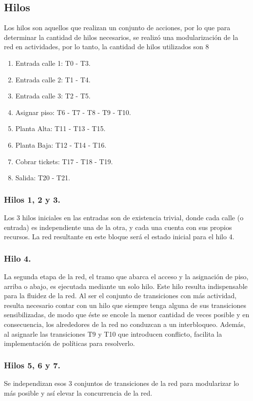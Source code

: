 \documentclass[12pt,a4paper]{article}
\begin{document}
\subsection{Hilos}
 Los hilos son aquellos que realizan un conjunto de acciones, por lo que para determinar la cantidad de hilos necesarios, se realizó una modularización de la red en actividades, por lo tanto, la cantidad de hilos utilizados son 8

\begin{enumerate}[leftmargin=1.5cm]
\item Entrada calle 1: T0 - T3.
\item Entrada calle 2: T1 - T4.
\item Entrada calle 3: T2 - T5.
\item Asignar piso: T6 - T7 - T8 - T9 - T10.
\item Planta Alta: T11 - T13 - T15.
\item Planta Baja: T12 - T14 - T16.
\item Cobrar tickets: T17 - T18 - T19.
\item Salida: T20 - T21.
\end{enumerate}
\subsubsection*{Hilos 1, 2 y 3.}
Los 3 hilos iniciales en las entradas son de existencia trivial, donde cada calle (o entrada) es independiente una de la otra, y cada una cuenta con sus propios recursos. La red resultante en este bloque será el estado inicial para el hilo 4.
\subsubsection*{Hilo 4.}
La segunda etapa de la red, el tramo que abarca el acceso y la asignación de piso, arriba o abajo, es ejecutada mediante un solo hilo.
Este hilo resulta indispensable para la fluidez de la red. Al ser el conjunto de transiciones con más actividad, resulta necesario contar con un hilo que siempre tenga alguna de sus transiciones sensibilizadas, de modo que éste se encole la menor cantidad de veces posible y en consecuencia, los alrededores de la red no conduzcan a un interbloqueo.
Además, al asignarle las transiciones T9 y T10 que introducen conflicto, facilita la implementación de políticas para resolverlo.
\subsubsection*{Hilos 5, 6 y 7.}
Se independizan esos 3 conjuntos de transiciones de la red para modularizar lo más posible y así elevar la concurrencia de la red.
\end{document}
